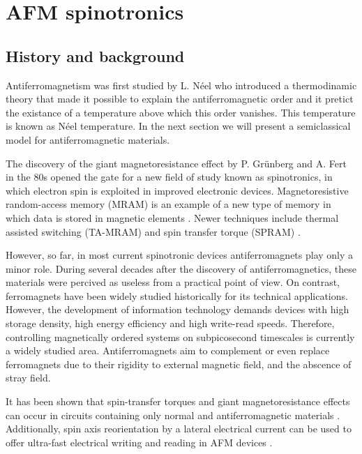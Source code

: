 \chapter{AFM spinotronics}

\section{History and background}

Antiferromagnetism was first studied by L. N\'eel who introduced a thermodinamic theory that made it possible to explain the antiferromagnetic order and it pretict the existance of a temperature above which this order vanishes. This temperature is known as N\'eel temperature. In the next section we will present a semiclassical model for antiferromagnetic materials.

The discovery of the giant magnetoresistance effect by P. Grünberg \cite{Binasch1989} and A. Fert \cite{Baibich1988} in the 80s opened the gate for a new field of study known as spinotronics, in which electron spin is exploited in improved electronic devices. Magnetoresistive random-access memory (MRAM) is an example of a new type of memory in which data is stored in magnetic elements \citep{Akerman2005}. Newer techniques include thermal assisted switching (TA-MRAM) \citep{Bandiera2015} and spin transfer torque (SPRAM) \citep{Kawahara2012}.

However, so far, in most current spinotronic devices antiferromagnets play only a minor role. During several decades after the discovery of antiferromagnetics, these materials were percived as useless from a practical point of view. On contrast, ferromagnets have been widely studied historically for its technical applications. However, the development of information technology demands devices with high storage density, high energy efficiency and high write-read speeds. Therefore, controlling magnetically ordered systems on subpicosecond timescales is currently a widely studied area. Antiferromagnets aim to complement or even replace ferromagnets due to their rigidity to external magnetic field, and the abscence of stray field.

It has been shown that spin-transfer torques and giant magnetoresistance effects can occur in circuits containing only normal and antiferromagnetic materials \cite{MacDonald2011}. Additionally, spin axis reorientation by a lateral electrical current can be used to offer ultra-fast electrical writing and reading in AFM devices \cite{Zelezny2014}.

